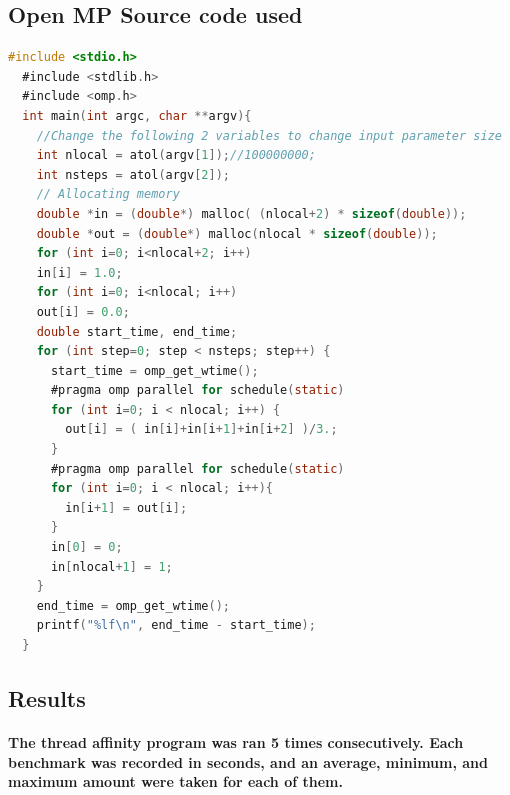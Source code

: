 \documentclass{article}
\begin{document}
\subsection{Open MP Source code used}

\begin{lstlisting}[language=C]
  #include <stdio.h>
  #include <stdlib.h>
  #include <omp.h>
  int main(int argc, char **argv){
    //Change the following 2 variables to change input parameter size
    int nlocal = atol(argv[1]);//100000000;
    int nsteps = atol(argv[2]);
    // Allocating memory
    double *in = (double*) malloc( (nlocal+2) * sizeof(double));
    double *out = (double*) malloc(nlocal * sizeof(double));
    for (int i=0; i<nlocal+2; i++)
    in[i] = 1.0;
    for (int i=0; i<nlocal; i++)
    out[i] = 0.0;
    double start_time, end_time;
    for (int step=0; step < nsteps; step++) {
      start_time = omp_get_wtime();
      #pragma omp parallel for schedule(static)
      for (int i=0; i < nlocal; i++) {
        out[i] = ( in[i]+in[i+1]+in[i+2] )/3.;
      }
      #pragma omp parallel for schedule(static)
      for (int i=0; i < nlocal; i++){
        in[i+1] = out[i];
      }
      in[0] = 0;
      in[nlocal+1] = 1;
    }
    end_time = omp_get_wtime();
    printf("%lf\n", end_time - start_time);
  }

\end{lstlisting}

\subsection{Results}

\paragraph{The thread affinity program was ran 5 times consecutively. Each benchmark was recorded in seconds, and an average, minimum, and maximum amount were taken for each of them.}
\end{document}
